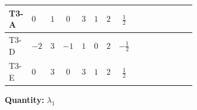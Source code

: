\documentclass[8pt]{article}
\begin{document}
\begin{landscape}
\begin{longtable}{@{}llcccccc >{\raggedright\arraybackslash}p{0.21\linewidth} >{\raggedright\arraybackslash}p{0.21\linewidth} >{\raggedright\arraybackslash}p{0.21\linewidth}@{}}
\midrule
T3-A & $0$ & $1$ & $0$ & $3$ & $1$ & $2$ & $\frac{1}{2}$ & \scriptsize\adjustbox{max width=\linewidth}{$\begin{gathered} +{g_1}^2 \left(\frac{3 {g_2}^2}{2}-3 {\lambda_1}\right)\end{gathered}$} & \scriptsize\adjustbox{max width=\linewidth}{$\begin{gathered} -9 {g_2}^2 {\lambda_1}\end{gathered}$} & \scriptsize\adjustbox{max width=\linewidth}{$\begin{gathered} +\frac{3 {g_1}^4}{4}\end{gathered}$} \\
\midrule
T3-D & $-2$ & $3$ & $-1$ & $1$ & $0$ & $2$ & $-\frac{1}{2}$ & \scriptsize\adjustbox{max width=\linewidth}{$\begin{gathered} +{g_1}^2 \left(\frac{3 {g_2}^2}{2}-3 {\lambda_1}\right)\end{gathered}$} & \scriptsize\adjustbox{max width=\linewidth}{$\begin{gathered} -9 {g_2}^2 {\lambda_1}\end{gathered}$} & \scriptsize\adjustbox{max width=\linewidth}{$\begin{gathered} +\frac{3 {g_1}^4}{4}\end{gathered}$} \\
\midrule
T3-E & $0$ & $3$ & $0$ & $3$ & $1$ & $2$ & $\frac{1}{2}$ & \scriptsize\adjustbox{max width=\linewidth}{$\begin{gathered} +{g_1}^2 \left(\frac{3 {g_2}^2}{2}-3 {\lambda_1}\right)\end{gathered}$} & \scriptsize\adjustbox{max width=\linewidth}{$\begin{gathered} -9 {g_2}^2 {\lambda_1}\end{gathered}$} & \scriptsize\adjustbox{max width=\linewidth}{$\begin{gathered} +\frac{3 {g_1}^4}{4}\end{gathered}$} \\
\midrule
\bottomrule
\end{longtable}
\clearpage
\noindent\textbf{Quantity: }$\lambda_1$\par\smallskip

\end{landscape}
\end{document}
